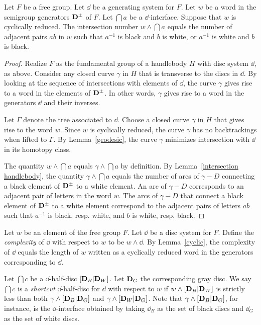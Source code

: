 \begin{lemma}
\label{intersection free group}
Let $F$ be a free group.  Let $\dd$ be a generating system for $F$.  Let $w$ be a word in the semigroup generators $\mathbf{D}^\pm$ of $F$.  Let $\dint{a}$ be a $\dd$-interface.  Suppose that $w$ is cyclically reduced.  The intersection number $w\wedge\dint{a}$ equals the number of adjacent pairs $ab$ in $w$ such that $a^{-1}$ is black and $b$ is white, or $a^{-1}$ is white and $b$ is black.
\end{lemma}

\begin{proof}
Realize $F$ as the fundamental group of a handlebody $H$ with disc system $\dd$, as above.  Consider any closed curve $\gamma$ in $H$ that is transverse to the discs in $\dd$.  By looking at the sequence of intersections with elements of $\dd$, the curve $\gamma$ gives rise to a word in the elements of $\mathbf{D}^\pm$.  In other words, $\gamma$ gives rise to a word in the generators $\dd$ and their inverses.

Let $\Gamma$ denote the tree associated to $\dd$.  Choose a closed curve $\gamma$ in $H$ that gives rise to the word $w$.  Since $w$ is cyclically reduced, the curve $\gamma$ has no backtrackings when lifted to $\Gamma$.  By Lemma~\ref{geodesic}, the curve $\gamma$ minimizes intersection with $\dd$ in its homotopy class.

The quantity $w\wedge\dint{a}$ equals $\gamma\wedge\dint{a}$ by definition.  By Lemma~\ref{intersection handlebody}, the quantity $\gamma\wedge\dint{a}$ equals the number of arcs of $\gamma-D$ connecting a black element of $\mathbf{D}^\pm$ to a white element.   An arc of $\gamma-D$ corresponds to an adjacent pair of letters in the word $w$.  The arcs of $\gamma-D$ that connect a black element of $\mathbf{D}^\pm$ to a white element correspond to the adjacent pairs of letters $ab$ such that $a^{-1}$ is black, resp. white, and $b$ is white, resp. black.
\end{proof}

Let $w$ be an element of the free group $F$.  Let $\dd$ be a disc system for $F$.  Define the \emph{complexity} of $\dd$ with respect to $w$ to be $w\wedge\dd$.  By Lemma~\ref{cyclic}, the complexity of $\dd$ equals the length of $w$ written as a cyclically reduced word in the generators corresponding to $\dd$.

Let $\dint{c}$ be a $\dd$-half-disc $[\mathbf{D}_B | \mathbf{D}_W]$.  Let $\mathbf{D}_G$ the corresponding gray disc.  We say $\dint{c}$ is a \emph{shortcut} $\dd$-half-disc for $\dd$ with respect to $w$ if $w\wedge[\mathbf{D}_B | \mathbf{D}_W]$ is strictly less than both $\gamma\wedge[\mathbf{D}_B | \mathbf{D}_G]$ and $\gamma\wedge[\mathbf{D}_W | \mathbf{D}_G]$.  Note that $\gamma\wedge[\mathbf{D}_B | \mathbf{D}_G]$, for instance, is the $\dd$-interface obtained by taking $\dd_{B}$ as the set of black discs and $\dd_{G}$ as the set of white discs.

